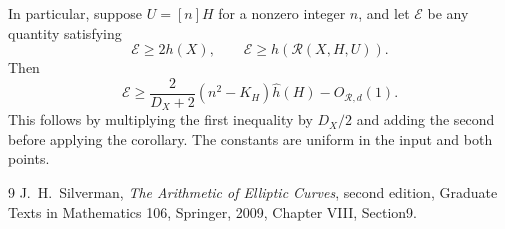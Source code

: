 \documentclass[11pt,a4paper]{article}
\begin{document}
In particular, suppose $U=[n]H$ for a nonzero integer $n$,
and let $\mathcal E$ be any quantity satisfying
\[
               \mathcal E\ge2h(X),\qquad
               \mathcal E\ge h(\mathcal R(X,H,U)).
\]
Then
\begin{equation}\label{eq:index-height}
 \mathcal E\ge\frac{2}{D_X+2}(n^2-K_H)\widehat h(H)-O_{\mathcal R,d}(1).
\end{equation}
This follows by multiplying the first inequality by $D_X/2$
and adding the second before applying the corollary.
The constants are uniform in the input and both points.

\begin{thebibliography}{9}
J.~H.~Silverman, \emph{The Arithmetic of Elliptic Curves},
second edition, Graduate Texts in Mathematics 106, Springer, 2009,
Chapter VIII, Section9.
\end{thebibliography}
\end{document}
